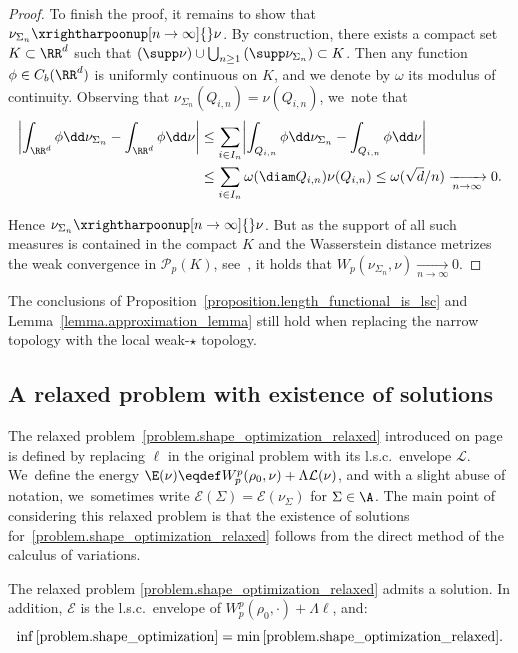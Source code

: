 \begin{proof}
To finish the proof, it remains to show that $\nu_{\Sigma_n} \xrightharpoonup[n \to \infty]{} \nu$. By construction, there exists a compact set $K \subset \RR^d$ such that $(\supp \nu)\cup \bigcup_{n\geq 1} \left(\supp \nu_{\Sigma_n}\right) \subset K$. Then any function $\phi \in C_b(\RR^d)$ is uniformly continuous on $K$, and we denote by $\omega$ its modulus of continuity.
Observing that $\nu_{\Sigma_n}(Q_{i,n}) = \nu(Q_{i,n})$, we~note that
\begin{align*}
\left|
\int_{\RR^d}\phi\dd\nu_{\Sigma_n}
-
\int_{\RR^d}\phi\dd\nu
\right|
&\le
\sum_{i \in I_n}
\biggl|
\int_{Q_{i,n}}\phi\dd\nu_{\Sigma_n} - \int_{Q_{i,n}}\phi\dd\nu
\biggr|\\
&\le
\sum_{i \in I_n} \omega(\diam Q_{i,n})\nu(Q_{i,n})
\le
\omega(\sqrt{d}/{n}) \xrightarrow[n \to \infty]{} 0.
\end{align*}

Hence $\nu_{\Sigma_n} \xrightharpoonup[n \to \infty]{} \nu$. But as the support of all such measures is contained in the compact $K$ and the Wasserstein distance metrizes the weak convergence in $\mathcal{P}_p(K)$, see~\cite[Th.\,5.10]{santambrogio2015optimal}, it holds that $W_p(\nu_{\Sigma_n}, \nu) \xrightarrow[n \to \infty]{} 0$.
\end{proof}

\begin{remark}
The conclusions of Proposition~\ref{proposition.length_functional_is_lsc} and Lemma~\ref{lemma.approximation_lemma} still hold when replacing the narrow topology with the local weak-$\star$ topology.
\end{remark}

\subsection{A relaxed problem with existence of solutions}
The relaxed problem~\eqref{problem.shape_optimization_relaxed} introduced on page~\pageref{problem.shape_optimization_relaxed} is defined by replacing $\ell$ in the original problem with its l.s.c.~envelope $\mathcal{L}$. We~define the energy $\E(\nu) \eqdef W_p^p(\rho_0, \nu) + \Lambda \mathcal{L}(\nu)$, and with a slight abuse of notation, we~sometimes write $\mathcal{E}(\Sigma) = \mathcal{E}(\nu_{\Sigma})$ for $\Sigma \in \A$.
The main point of considering this relaxed problem is that the existence of solutions for~\eqref{problem.shape_optimization_relaxed} follows from the direct method of the calculus of variations.

\begin{theorem}\label{theorem.existence_relaxed_problem}
The relaxed problem \eqref{problem.shape_optimization_relaxed} admits a solution. In addition, $\mathcal{E}$ is the l.s.c.~envelope of $W_p^p(\rho_0, \cdot) + \Lambda \ell$, and:
\[
\inf \eqref{problem.shape_optimization} =
\min \eqref{problem.shape_optimization_relaxed}.
\]
\end{theorem}

